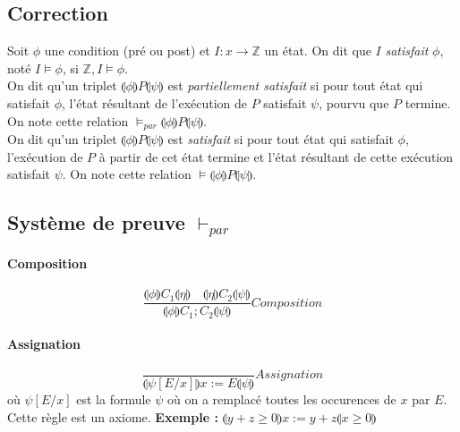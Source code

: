 \documentclass[a4paper]{article}
\begin{document}
  \subsection{Correction}
  Soit $\phi$ une condition (pré ou post) et $I:x\rightarrow \mathbb{Z}$ un état. 
  On dit que $I$ \textit{satisfait} $\phi$, noté $I \vDash \phi$, si $\mathbb{Z}, I \vDash \phi$.\\

  On dit qu'un triplet $\llparenthesis \phi\rrparenthesis P\llparenthesis \psi\rrparenthesis $ est \textit{partiellement satisfait} si
  pour tout état qui satisfait $\phi$, l'état résultant de l'exécution de $P$
  satisfait $\psi$, pourvu que $P$ termine. On note cette relation $\vDash_{par} \llparenthesis \phi\rrparenthesis P\llparenthesis \psi\rrparenthesis $.\\

  On dit qu'un triplet $\llparenthesis \phi\rrparenthesis P\llparenthesis \psi\rrparenthesis $ est \textit{satisfait} si
  pour tout état qui satisfait $\phi$, l'exécution de $P$ à partir de cet état termine
  et l'état résultant de cette exécution satisfait $\psi$. On note cette relation $\vDash \llparenthesis \phi\rrparenthesis P\llparenthesis \psi\rrparenthesis $.

  \subsection{Système de preuve $\vdash_{par}$}

  \paragraph{Composition}
  $$ \frac{\llparenthesis \phi\rrparenthesis C_1\llparenthesis \eta\rrparenthesis \quad \llparenthesis \eta\rrparenthesis C_2\llparenthesis \psi\rrparenthesis }{\llparenthesis \phi\rrparenthesis C_1;C_2 \llparenthesis \psi\rrparenthesis }Composition $$

  \paragraph{Assignation}
  $$ \frac{}{\llparenthesis \psi[E/x] \rrparenthesis x:=E \llparenthesis \psi \rrparenthesis}Assignation $$
  où $\psi[E/x]$ est la formule $\psi$ où on a remplacé toutes les occurences de $x$ par $E$.
  Cette règle est un axiome. \textbf{Exemple :} $\llparenthesis y+z \geq 0 \rrparenthesis x:= y+z \llparenthesis x \geq 0 \rrparenthesis$
\end{document}
